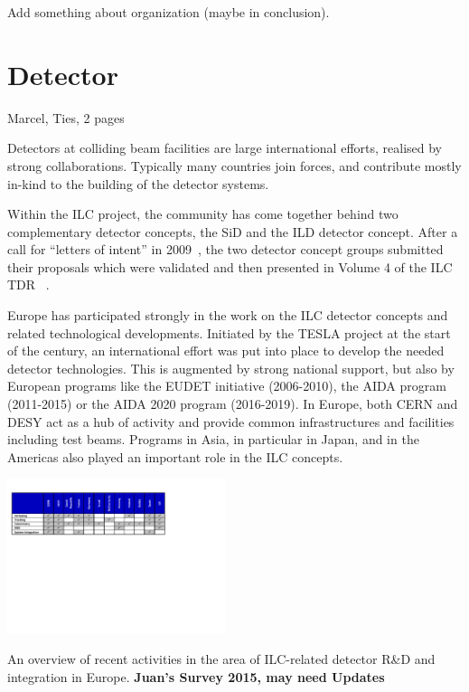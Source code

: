\documentclass[%
 reprint,
 amsmath,amssymb,
 aps,
]{revtex4-1}
\begin{document}
Add something about organization (maybe in conclusion).

\section{\label{sec:det}Detector}
Marcel, Ties, 2 pages

Detectors at colliding beam facilities are large international efforts, realised by strong collaborations. Typically many countries join forces, and contribute mostly in-kind to the building of the detector systems. 

Within the ILC project, the community has come together behind two complementary detector concepts, the SiD and the ILD detector concept. After a call for ``letters of intent'' in 2009~\cite{Aihara:2009ad,Abe:2010aa}, the two detector concept groups submitted their proposals which were validated and then presented in Volume 4 of the ILC TDR ~\cite{Behnke:2013lya}.

Europe has participated strongly in the work on the ILC detector concepts and related technological developments. Initiated by the TESLA project at the start of the century, an international effort was put into place to develop the needed detector technologies. This is augmented by strong national support, but also by European programs like the EUDET initiative (2006-2010), the AIDA program (2011-2015) or the AIDA 2020 program (2016-2019). In Europe, both CERN and DESY act as a hub of activity and provide common infrastructures and facilities including test beams. Programs in Asia, in particular in Japan, and in the Americas also played an important role in the ILC concepts. 

\begin{table}[htbp]
\includegraphics[width=0.48\textwidth]{figures/ILCEAP-Matrices-detectors.pdf}
\caption{\label{tab:PrePrep:detectors} An overview of recent activities in the area of ILC-related detector R\&D and integration in Europe. \bfseries{Juan's Survey 2015, may need Updates}}
\end{table}
\end{document}
